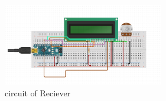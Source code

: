 \begin{figure}[htbp]
    \includegraphics[width=7cm, keepaspectratio]{figures/circuit_rx.png}
    \centering
    \caption{circuit of Reciever}
    \label{fig:fig8}
\end{figure}